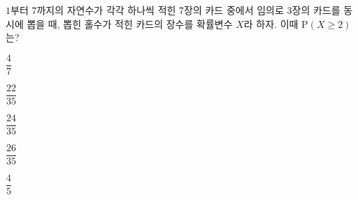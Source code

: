 $1$부터 $7$까지의 자연수가 각각 하나씩 적힌 7장의 카드 중에서 임의로 3장의 카드를 동시에 뽑을 때, 뽑힌 홀수가 적힌 카드의 장수를 확률변수 $X$라 하자. 이때 $\mathrm{P}(X\ge 2)$는?
\begin{choicesii}{\rule[-3ex]{0pt}{8ex}$\dfrac{4}{7}$}{\rule[-3ex]{0pt}{8ex}$\dfrac{22}{35}$}{\rule[-3ex]{0pt}{8ex}$\dfrac{24}{35}$}{\rule[-3ex]{0pt}{8ex}$\dfrac{26}{35}$}{\rule[-3ex]{0pt}{8ex}$\dfrac{4}{5}$}\end{choicesii}
